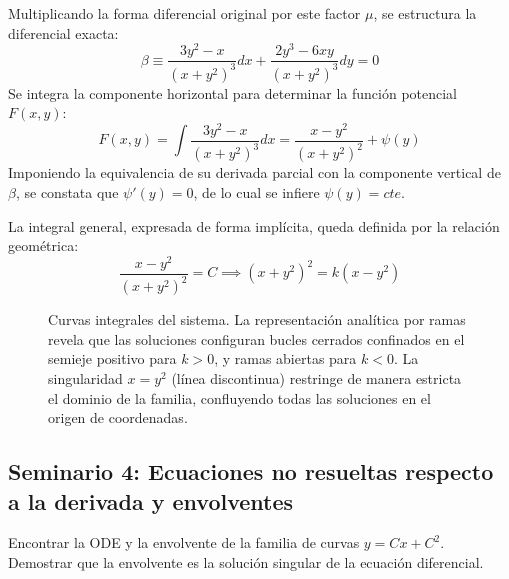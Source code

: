 \begin{tcolorbox}
Multiplicando la forma diferencial original por este factor $\mu$, se estructura la diferencial exacta:
$$ \beta \equiv \frac{3y^2 - x}{(x + y^2)^3}dx + \frac{2y^3 - 6xy}{(x + y^2)^3}dy = 0 $$
Se integra la componente horizontal para determinar la función potencial $F(x,y)$:
$$ F(x,y) = \int \frac{3y^2 - x}{(x + y^2)^3} dx = \frac{x - y^2}{(x + y^2)^2} + \psi(y) $$
Imponiendo la equivalencia de su derivada parcial con la componente vertical de $\beta$, se constata que $\psi'(y) = 0$, de lo cual se infiere $\psi(y) = cte$.

La integral general, expresada de forma implícita, queda definida por la relación geométrica:
$$ \frac{x - y^2}{(x + y^2)^2} = C \implies (x + y^2)^2 = k(x - y^2) $$

\begin{figure}[H]
    \centering
    
    \caption{Curvas integrales del sistema. La representación analítica por ramas revela que las soluciones configuran bucles cerrados confinados en el semieje positivo para $k>0$, y ramas abiertas para $k<0$. La singularidad $x=y^2$ (línea discontinua) restringe de manera estricta el dominio de la familia, confluyendo todas las soluciones en el origen de coordenadas.}
\end{figure}
\end{tcolorbox}

\subsection{Seminario 4: Ecuaciones no resueltas respecto a la derivada y envolventes}

\begin{ejercicio}
Encontrar la ODE y la envolvente de la familia de curvas $y = Cx + C^2$. Demostrar que la envolvente es la solución singular de la ecuación diferencial.
\end{ejercicio}


